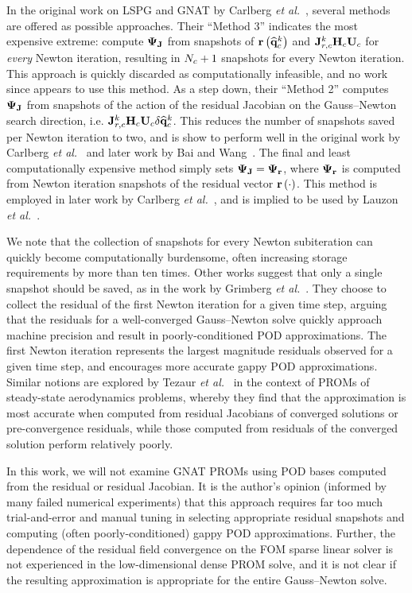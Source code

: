 In the original work on LSPG and GNAT by Carlberg \textit{et al.}~\cite{Carlberg2010}, several methods are offered as possible approaches. Their ``Method 3'' indicates the most expensive extreme: compute $\deimBasisJacob$ from snapshots of $\mathbf{r}\left(\mathbf{\widehat{q}}_{c}^{k}\right)$ and $\jacobResCons^{\newtonIdx} \consScale \consTrial$ for \textit{every} Newton iteration, resulting in $N_c + 1$ snapshots for every Newton iteration. This approach is quickly discarded as computationally infeasible, and no work since appears to use this method. As a step down, their ``Method 2'' computes $\deimBasisJacob$ from snapshots of the action of the residual Jacobian on the Gauss--Newton search direction, i.e. $\jacobResCons^{\newtonIdx} \consScale \consTrial \delta \consVecCoef^{\newtonIdx}$. This reduces the number of snapshots saved per Newton iteration to two, and is show to perform well in the original work by Carlberg \textit{et al.}~\cite{Carlberg2010} and later work by Bai and Wang~\cite{Bai2022}. The final and least computationally expensive method simply sets $\deimBasisJacob = \deimBasisRes$, where $\deimBasisRes$ is computed from Newton iteration snapshots of the residual vector $\mathbf{r}\left(\cdot\right)$. This method is employed in later work by Carlberg \textit{et al.}~\cite{Carlberg2013,Carlberg2017}, and is implied to be used by Lauzon \textit{et al.}~\cite{Lauzon2022}.

We note that the collection of snapshots for every Newton subiteration can quickly become computationally burdensome, often increasing storage requirements by more than ten times. Other works suggest that only a single snapshot should be saved, as in the work by Grimberg \textit{et al.}~\cite{Grimberg2021}. They choose to collect the residual of the first Newton iteration for a given time step, arguing that the residuals for a well-converged Gauss--Newton solve quickly approach machine precision and result in poorly-conditioned POD approximations. The first Newton iteration represents the largest magnitude residuals observed for a given time step, and encourages more accurate gappy POD approximations. Similar notions are explored by Tezaur \textit{et al.}~\cite{Tezaur2022} in the context of PROMs of steady-state aerodynamics problems, whereby they find that the approximation is most accurate when computed from residual Jacobians of converged solutions or pre-convergence residuals, while those computed from residuals of the converged solution perform relatively poorly.

In this work, we will not examine GNAT PROMs using POD bases computed from the residual or residual Jacobian. It is the author's opinion (informed by many failed numerical experiments) that this approach requires far too much trial-and-error and manual tuning in selecting appropriate residual snapshots and computing (often poorly-conditioned) gappy POD approximations. Further, the dependence of the residual field convergence on the FOM sparse linear solver is not experienced in the low-dimensional dense PROM solve, and it is not clear if the resulting approximation is appropriate for the entire Gauss--Newton solve.

